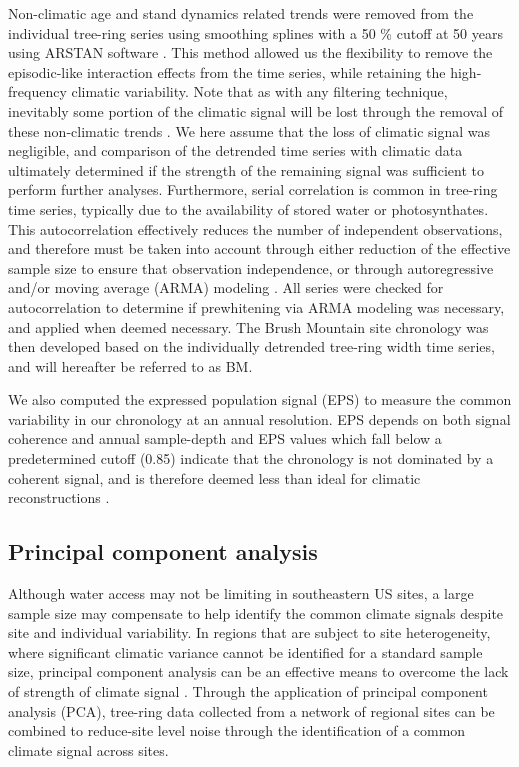 Non-climatic age and stand dynamics related trends were removed from
the individual tree-ring series using smoothing splines with a 50 \%
cutoff at 50 years using ARSTAN software \cite{cook1997calculating}. This
method allowed us the flexibility to remove the episodic-like interaction
effects from the time series, while retaining the high-frequency climatic
variability. Note that as with any filtering technique, inevitably some
portion of the climatic signal will be lost through the removal of these
non-climatic trends \cite{cook1981smoothing}. We here assume that the loss
of climatic signal was negligible, and comparison of the detrended time
series with climatic data ultimately determined if the strength of the
remaining signal was sufficient to perform further analyses. Furthermore,
serial correlation is common in tree-ring time series, typically due to
the availability of stored water or photosynthates. This autocorrelation
effectively reduces the number of independent observations, and
therefore must be taken into account through either reduction of the
effective sample size to ensure that observation independence, or
through autoregressive and/or moving average (ARMA)\label{sym:ARMA}
modeling \cite{monserud1986time, cook1987decomposition}. All series
were checked for autocorrelation to determine if prewhitening via ARMA
modeling was necessary, and applied when deemed necessary. The Brush
Mountain site chronology was then developed based on the individually
detrended tree-ring width time series, and will hereafter be referred
to as BM. \label{sym:BM}

We also computed the expressed population signal (EPS)\label{sym:EPS}
to measure the common variability in our chronology at an annual
resolution. EPS depends on both signal coherence and annual sample-depth
and EPS values which fall below a predetermined cutoff (0.85)
indicate that the chronology is not dominated by a coherent signal,
and is therefore deemed less than ideal for climatic reconstructions
\cite{wigley1984average}.


\subsection{Principal component analysis}

Although water access may not be limiting in southeastern US sites,
a large sample size may compensate to help identify the common climate
signals despite site and individual variability. In regions that are
subject to site heterogeneity, where significant climatic variance
cannot be identified for a standard sample size, principal component
analysis can be an effective means to overcome the lack of strength
of climate signal \cite{peters1981principal, anchukaitis2006forward,
jacoby1989reconstructed}. Through the application of principal component
analysis (PCA)\label{sym:PCA}, tree-ring data collected from a network
of regional sites can be combined to reduce-site level noise through
the identification of a common climate signal across sites.

